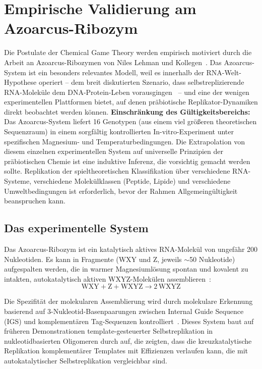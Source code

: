 \documentclass[12pt,a4paper]{article}
\theoremstyle{remark}
\begin{document}
\section{Empirische Validierung am Azoarcus-Ribozym}
\label{sec:azoarcus}

Die Postulate der Chemical Game Theory werden empirisch motiviert durch die Arbeit an Azoarcus-Ribozymen von Niles Lehman und Kollegen~\citep{AzoarcusPNAS,AzoarcusPMC}. Das Azoarcus-System ist ein besonders relevantes Modell, weil es innerhalb der RNA-Welt-Hypothese operiert -- dem breit diskutierten Szenario, dass selbstreplizierende RNA-Moleküle dem DNA-Protein-Leben vorausgingen~\citep{Gilbert1986,Eigen1979} -- und eine der wenigen experimentellen Plattformen bietet, auf denen präbiotische Replikator-Dynamiken direkt beobachtet werden können. \textbf{Einschränkung des Gültigkeitsbereichs:} Das Azoarcus-System liefert 16 Genotypen (aus einem viel größeren theoretischen Sequenzraum) in einem sorgfältig kontrollierten In-vitro-Experiment unter spezifischen Magnesium- und Temperaturbedingungen. Die Extrapolation von diesem einzelnen experimentellen System auf universelle Prinzipien der präbiotischen Chemie ist eine induktive Inferenz, die vorsichtig gemacht werden sollte. Replikation der spieltheoretischen Klassifikation über verschiedene RNA-Systeme, verschiedene Molekülklassen (Peptide, Lipide) und verschiedene Umweltbedingungen ist erforderlich, bevor der Rahmen Allgemeingültigkeit beanspruchen kann.

\subsection{Das experimentelle System}

Das Azoarcus-Ribozym ist ein katalytisch aktives RNA-Molekül von ungefähr 200 Nukleotiden. Es kann in Fragmente (WXY und Z, jeweils $\sim$50 Nukleotide) aufgespalten werden, die in warmer Magnesiumlösung spontan und kovalent zu intakten, autokatalytisch aktiven WXYZ-Molekülen assemblieren~\citep{AzoarcusPMC}:
\begin{equation}
\text{WXY} + \text{Z} + \text{WXYZ} \longrightarrow 2\,\text{WXYZ}
\end{equation}

Die Spezifität der molekularen Assemblierung wird durch molekulare Erkennung basierend auf 3-Nukleotid-Basenpaarungen zwischen Internal Guide Sequence (IGS) und komplementären \glqq Tag\grqq{}-Sequenzen kontrolliert~\citep{AzoarcusPNAS}. Dieses System baut auf früheren Demonstrationen template-gesteuerter Selbstreplikation in nukleotidbasierten Oligomeren durch \citet{SieversKiedrowski1994} auf, die zeigten, dass die kreuzkatalytische Replikation komplementärer Templates mit Effizienzen verlaufen kann, die mit autokatalytischer Selbstreplikation vergleichbar sind.
\end{document}
